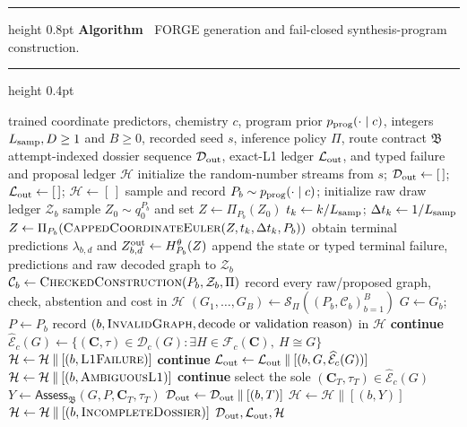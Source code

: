 \begingroup
\setlength{\parskip}{0pt}
\hrule height 0.8pt\kern 2pt
\noindent\textbf{Algorithm~\thealgorithm} FORGE generation and fail-closed synthesis-program construction.
\label{alg:forge-inference}
\par\nobreak\kern 2pt\hrule height 0.4pt\nobreak
\begin{algorithmic}[1]
\Require trained coordinate predictors, chemistry $c$, program prior $p_{\rm prog}(\cdot\mid c)$,
integers $L_{\rm samp},D\geq1$ and $B\geq0$, recorded seed $s$, inference policy $\Pi$,
route contract $\mathfrak B$
\Ensure attempt-indexed dossier sequence $\mathcal D_{\rm out}$, exact-L1 ledger $\mathcal L_{\rm out}$,
and typed failure and proposal ledger $\mathcal H$
\State initialize the random-number streams from $s$;
$\mathcal D_{\rm out}\gets[\,]$; $\mathcal L_{\rm out}\gets[\,]$; $\mathcal H\gets[\,]$
    \State sample and record $P_b\sim p_{\rm prog}(\cdot\mid c)$; initialize raw draw ledger $\mathcal Z_b$
        \State sample $Z_0\sim q_0^{P_b}$ and set $Z\gets\Pi_{P_b}(Z_0)$
            \State $t_k\gets k/L_{\rm samp}$; $\Delta t_k\gets1/L_{\rm samp}$
            \State $Z\gets\Pi_{P_b}\!\left(\Call{CappedCoordinateEuler}{Z,t_k,\Delta t_k,P_b}\right)$
        \EndFor
        \State obtain terminal predictions $\lambda_{b,d}$ and $Z^{\rm out}_{b,d}\gets H_{P_b}^\theta(Z)$
        \State append the state or typed terminal failure, predictions and raw decoded graph to $\mathcal Z_b$
    \EndFor
    \State $\mathcal C_b\gets\Call{CheckedConstruction}{P_b,\mathcal Z_b,\Pi}$
    \State record every raw/proposed graph, check, abstention and cost in $\mathcal H$
\EndFor
\State $(G_1,\ldots,G_B)\gets\mathcal S_\Pi((P_b,\mathcal C_b)_{b=1}^{B})$
    \State $G\gets G_b$; $P\gets P_b$
        \State record $(b,\textsc{InvalidGraph},\text{decode or validation reason})$ in $\mathcal H$
        \State \textbf{continue}
    \EndIf
    \State $\widehat{\mathcal{E}}_c(G)\gets
    \{(\mathbf C,\tau)\in\mathcal D_c(G):\exists H\in\mathcal F_c(\mathbf C),\ H\cong G\}$
        \State $\mathcal H\gets\mathcal H\mathbin{\|}[(b,\textsc{L1Failure})]$
        \State \textbf{continue}
    \EndIf
    \State $\mathcal L_{\rm out}\gets\mathcal L_{\rm out}\mathbin{\|}
    [(b,G,\widehat{\mathcal E}_c(G))]$
        \State $\mathcal H\gets\mathcal H\mathbin{\|}[(b,\textsc{AmbiguousL1})]$
        \State \textbf{continue}
    \EndIf
    \State select the sole $(\mathbf C_T,\tau_T)\in\widehat{\mathcal E}_c(G)$
    \State $Y\gets\mathsf{Assess}_{\mathfrak B}(G,P,\mathbf C_T,\tau_T)$
        \State $\mathcal D_{\rm out}\gets\mathcal D_{\rm out}\mathbin{\|}[(b,T)]$
        \State $\mathcal H\gets\mathcal H\mathbin{\|}[(b,Y)]$
    \Else
        \State $\mathcal H\gets\mathcal H\mathbin{\|}[(b,\textsc{IncompleteDossier})]$
    \EndIf
\EndFor
\State \Return $\mathcal D_{\rm out},\mathcal L_{\rm out},\mathcal H$
\end{algorithmic}

